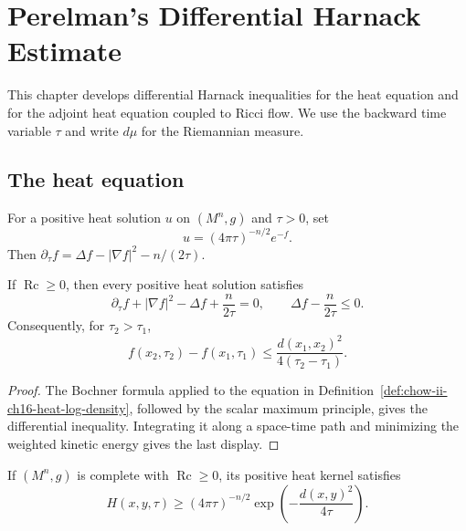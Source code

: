 \chapter{Perelman's Differential Harnack Estimate}
\label{ch:chow-ii-perelman-differential-harnack}

This chapter develops differential Harnack inequalities for the heat equation
and for the adjoint heat equation coupled to Ricci flow. We use the backward
time variable $\tau$ and write $d\mu$ for the Riemannian measure.

\section{The heat equation}

\begin{definition}
\label{def:chow-ii-ch16-heat-log-density}
For a positive heat solution $u$ on $(M^n,g)$ and $\tau>0$, set
\[
u=(4\pi\tau)^{-n/2}e^{-f}.
\]
Then $\partial_\tau f=\Delta f-|\nabla f|^2-n/(2\tau)$.
\end{definition}

\begin{theorem}
\label{thm:chow-ii-ch16-li-yau}
If $\operatorname{Rc}\ge0$, then every positive heat solution satisfies
\[
\partial_\tau f+|\nabla f|^2-\Delta f+\frac{n}{2\tau}=0,
\qquad \Delta f-\frac{n}{2\tau}\le0.
\]
Consequently, for $\tau_2>\tau_1$,
\[
f(x_2,\tau_2)-f(x_1,\tau_1)\le
 \frac{d(x_1,x_2)^2}{4(\tau_2-\tau_1)}.
\]
\end{theorem}
\begin{proof}
The Bochner formula applied to the equation in
Definition~\ref{def:chow-ii-ch16-heat-log-density}, followed by the scalar
maximum principle, gives the differential inequality. Integrating it along a
space-time path and minimizing the weighted kinetic energy gives the last
display.
\end{proof}

\begin{theorem}
\label{thm:chow-ii-ch16-cheeger-yau}
If $(M^n,g)$ is complete with $\operatorname{Rc}\ge0$, its positive heat kernel
satisfies
\[
H(x,y,\tau)\ge(4\pi\tau)^{-n/2}
 \exp\!\left(-\frac{d(x,y)^2}{4\tau}\right).
\]
\end{theorem}

